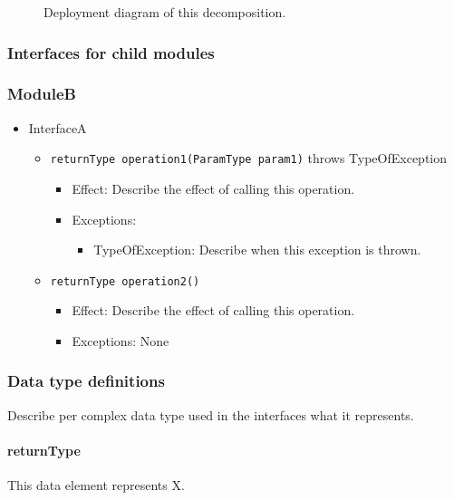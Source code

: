 \documentclass[a4paper,10pt]{article}
\begin{document}
\begin{figure}[!htp]
    \centering
    \caption{Deployment diagram of this decomposition.
        }\label{fig:it2-depl_main}
\end{figure}

\subsubsection{Interfaces for child modules}
\subsubsection*{ModuleB}
\begin{itemize}
    \item InterfaceA
    \begin{itemize}
        \item \texttt{returnType operation1(ParamType param1)} throws TypeOfException
        \begin{itemize}
            \item Effect: Describe the effect of calling this operation.
            \item Exceptions: 
            \begin{itemize}
                \item TypeOfException: Describe when this exception is thrown.
            \end{itemize}
        \end{itemize}

        \item \texttt{returnType operation2()}
        \begin{itemize}
            \item Effect: Describe the effect of calling this operation.
            \item Exceptions: None
         \end{itemize}
    \end{itemize}
\end{itemize}

\subsubsection{Data type definitions}
Describe per complex data type used in the interfaces what it represents.

\paragraph{returnType} This data element represents X.
\end{document}
